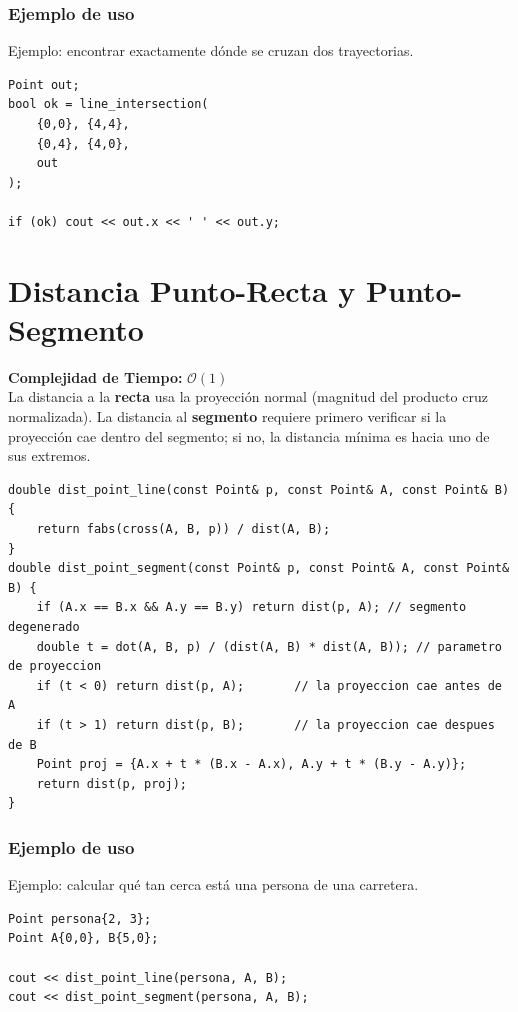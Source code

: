 \documentclass[10pt,twocolumn,letterpaper]{report}
\begin{document}
\subsubsection*{Ejemplo de uso}
Ejemplo: encontrar exactamente dónde se cruzan dos trayectorias.
\begin{lstlisting}
Point out;
bool ok = line_intersection(
    {0,0}, {4,4},
    {0,4}, {4,0},
    out
);

if (ok) cout << out.x << ' ' << out.y;
\end{lstlisting}

\section{Distancia Punto-Recta y Punto-Segmento}
\textbf{Complejidad de Tiempo:} $\mathcal{O}(1)$ \\
La distancia a la \textbf{recta} usa la proyección normal (magnitud del producto cruz normalizada). La distancia al \textbf{segmento} requiere primero verificar si la proyección cae dentro del segmento; si no, la distancia mínima es hacia uno de sus extremos.
\begin{lstlisting}
double dist_point_line(const Point& p, const Point& A, const Point& B) {
    return fabs(cross(A, B, p)) / dist(A, B);
}
double dist_point_segment(const Point& p, const Point& A, const Point& B) {
    if (A.x == B.x && A.y == B.y) return dist(p, A); // segmento degenerado
    double t = dot(A, B, p) / (dist(A, B) * dist(A, B)); // parametro de proyeccion
    if (t < 0) return dist(p, A);       // la proyeccion cae antes de A
    if (t > 1) return dist(p, B);       // la proyeccion cae despues de B
    Point proj = {A.x + t * (B.x - A.x), A.y + t * (B.y - A.y)};
    return dist(p, proj);
}
\end{lstlisting}
\subsubsection*{Ejemplo de uso}
Ejemplo: calcular qué tan cerca está una persona de una carretera.
\begin{lstlisting}
Point persona{2, 3};
Point A{0,0}, B{5,0};

cout << dist_point_line(persona, A, B);
cout << dist_point_segment(persona, A, B);
\end{lstlisting}
\end{document}
